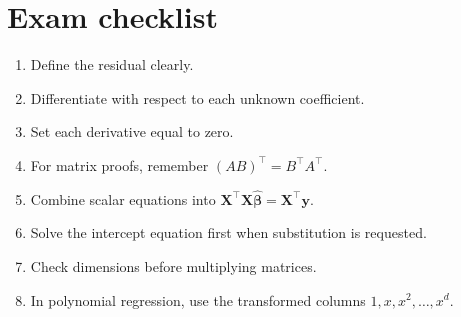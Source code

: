 ﻿\documentclass[11pt]{article}
\newcommand{\yvec}{\mathbf y}
\newcommand{\bvec}{\boldsymbol\beta}
\newcommand{\xmat}{\mathbf X}
\begin{document}
\section*{Exam checklist}
\begin{enumerate}[leftmargin=*]
\item Define the residual clearly.
\item Differentiate with respect to each unknown coefficient.
\item Set each derivative equal to zero.
\item For matrix proofs, remember $(AB)^\top=B^\top A^\top$.
\item Combine scalar equations into $\xmat^\top\xmat\widehat{\bvec}=\xmat^\top\yvec$.
\item Solve the intercept equation first when substitution is requested.
\item Check dimensions before multiplying matrices.
\item In polynomial regression, use the transformed columns $1,x,x^2,\ldots,x^d$.
\end{enumerate}
\end{document}
